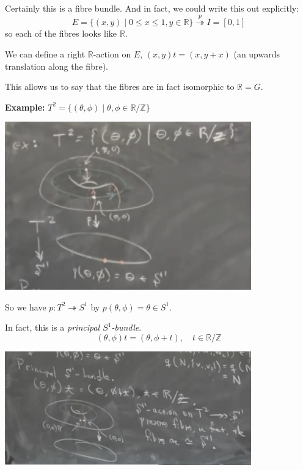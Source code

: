 \documentclass[12pt]{article}
\newcommand{\R}{\mathbb{R}}
\newcommand{\Z}{\mathbb{Z}}
\begin{document}
    Certainly this is a fibre bundle. And in fact, we could write this out explicitly:
    \[E = \{(x, y) \; | \; 0 \leq x \leq 1, y \in \R\} \overset{p}{\twoheadrightarrow} I = [0, 1]\]
    so each of the fibres looks like $\R$. 

    We can define a right $\R$-action on $E$, $(x, y)t = (x, y + x)$ (an upwards translation along the fibre). 

    This allows us to say that the fibres are in fact isomorphic to $\R = G$. 

    \textbf{Example:} $T^2 = \{(\theta, \phi) \; | \; \theta, \phi \in \R/\Z\}$

    \begin{center}
        \includegraphics[width=0.8\textwidth]{Images/April 17 - T2} 
    \end{center}

    So we have $p: T^2 \twoheadrightarrow S^1$ by $p(\theta, \phi) = \theta \in S^1$. 

    In fact, this is a \emph{principal $S^1$-bundle}. 
    \[(\theta, \phi)t = (\theta, \phi + t), \quad t \in \R/\Z\]

    \begin{center}
        \includegraphics[width=0.8\textwidth]{Images/April 17 - T2 principal S1}
    \end{center}
\end{document}
